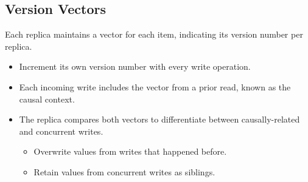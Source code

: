\subsection{Version Vectors}
Each replica maintains a vector for each item, indicating its version number per replica.
    \begin{itemize}
        \item Increment its own version number with every write operation.
        \item Each incoming write includes the vector from a prior read, known as the causal context.
        \item The replica compares both vectors to differentiate between causally-related and concurrent writes.
        \begin{itemize}
            \item Overwrite values from writes that happened before.
            \item Retain values from concurrent writes as siblings.
        \end{itemize}
    \end{itemize}

